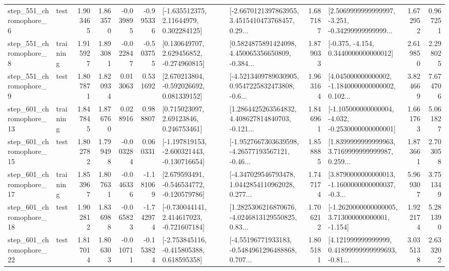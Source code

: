 \begin{tabular}{llrrrrllrlrr}
   step\_551\_chromophore\_6 &      test &      1.903465 &    1.863570 &     -0.039895 & -0.995336 &     [-1.635512375, 2.11644979, 0.302284125] &  [-2.6670121397863955, 3.4515410473768457, 0.29... &       1.687187 &  [2.5069999999999997, -3.251, -0.34299999999999... &            1.672952 &          0.967251 \\
   step\_551\_chromophore\_8 &  training &      1.915927 &    1.893081 &     -0.022847 & -0.503755 &    [0.130649707, 2.629456852, -0.274960815] &  [0.5824875891424098, 4.450065356650809, -0.384... &       1.879033 &               [-0.375, -4.154, 0.3440000000000012] &            2.619850 &          2.298025 \\
   step\_551\_chromophore\_9 &      test &      1.807871 &    1.820934 &      0.013063 &  0.531692 &    [2.670213804, -0.592026692, 0.081339152] &  [-4.5213409789030905, 0.9547225832473808, -0.6... &       1.963164 &  [4.045000000000002, -1.1840000000000002, 0.102... &            3.824669 &          7.674706 \\
  step\_601\_chromophore\_13 &  training &      1.847845 &    1.876760 &      0.028916 &  0.988807 &      [0.715023097, 2.69123846, 0.246753461] &  [1.2864425263564832, 4.408627814840703, -0.121... &       1.846961 &  [-1.105000000000004, -4.032, -0.2530000000000001] &            1.661763 &          5.061827 \\
  step\_601\_chromophore\_15 &      test &      1.802782 &    1.799498 &     -0.003284 &  0.060331 &  [-1.197819153, -2.600321443, -0.130716654] &  [-1.9527667303639598, -4.26577193567121, -0.46... &       1.858885 &  [1.8399999999999963, 3.7169999999999987, 0.259... &            1.873661 &          2.703058 \\
  step\_601\_chromophore\_17 &  training &      1.853967 &    1.807631 &     -0.046336 & -1.181069 &   [2.679593491, -0.546534772, -0.120579786] &  [-4.347029546793478, 1.0442854110962028, 0.277... &       1.747174 &  [3.8790000000000013, -1.1600000000000037, -0.3... &            5.969307 &          3.751349 \\
  step\_601\_chromophore\_18 &      test &      1.902812 &    1.836988 &     -0.065823 & -1.742974 &   [-0.730044141, 2.414617023, -0.721607184] &  [1.2825306216870676, -4.0246813129550825, 0.83... &       1.706212 &   [-1.2620000000000005, 3.713000000000001, -1.154] &            1.922174 &          5.281390 \\
  step\_601\_chromophore\_22 &      test &      1.817014 &    1.806303 &     -0.010711 & -0.153824 &   [-2.753845116, -0.415805388, 0.618595358] &  [-4.55196771933183, -0.5484961296488868, 0.707... &       1.805181 &  [4.121999999999999, 0.41899999999999693, -0.81... &            3.035138 &          2.633202 \\

\end{tabular}
